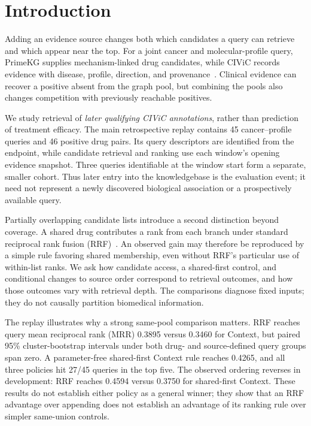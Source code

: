\section{Introduction}
\label{sec:intro}
Adding an evidence source changes both which candidates a query can retrieve and which appear near the top. For a joint cancer and molecular-profile query, PrimeKG supplies mechanism-linked drug candidates, while CIViC records evidence with disease, profile, direction, and provenance~\cite{primekg,civic2022}. Clinical evidence can recover a positive absent from the graph pool, but combining the pools also changes competition with previously reachable positives.

We study retrieval of \emph{later qualifying CIViC annotations}, rather than prediction of treatment efficacy. The main retrospective replay contains 45 cancer--profile queries and 46 positive drug pairs. Its query descriptors are identified from the endpoint, while candidate retrieval and ranking use each window's opening evidence snapshot. Three queries identifiable at the window start form a separate, smaller cohort. Thus later entry into the knowledgebase is the evaluation event; it need not represent a newly discovered biological association or a prospectively available query.

Partially overlapping candidate lists introduce a second distinction beyond coverage. A shared drug contributes a rank from each branch under standard reciprocal rank fusion (RRF)~\cite{rrf}. An observed gain may therefore be reproduced by a simple rule favoring shared membership, even without RRF's particular use of within-list ranks. We ask how candidate access, a shared-first control, and conditional changes to source order correspond to retrieval outcomes, and how those outcomes vary with retrieval depth. The comparisons diagnose fixed inputs; they do not causally partition biomedical information.

The replay illustrates why a strong same-pool comparison matters. RRF reaches query mean reciprocal rank (MRR) 0.3895 versus 0.3460 for Context, but paired 95\% cluster-bootstrap intervals under both drug- and source-defined query groups span zero. A parameter-free shared-first Context rule reaches 0.4265, and all three policies hit 27/45 queries in the top five. The observed ordering reverses in development: RRF reaches 0.4594 versus 0.3750 for shared-first Context. These results do not establish either policy as a general winner; they show that an RRF advantage over appending does not establish an advantage of its ranking rule over simpler same-union controls.

